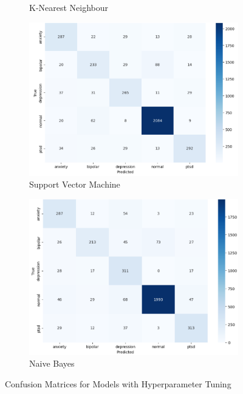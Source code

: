 \begin{figure}[H]
\begin{subfigure}[b]{0.49\textwidth}
        \caption*{K-Nearest Neighbour}
        \label{LSTMROC4}  %
    \end{subfigure}
    \hfill
    \begin{subfigure}[b]{0.49\textwidth}
        \centering
        \includegraphics[width=\textwidth]{Images/HP SVM CM.png}
        \caption*{Support Vector Machine}
        \label{LSTMROC6}  %
    \end{subfigure}
    \hfill
    \begin{subfigure}[b]{0.49\textwidth}
        \centering
        \includegraphics[width=\textwidth]{Images/HP NB CM.png}
        \caption*{Naive Bayes}
        \label{LSTMROC7}  %
        
    \end{subfigure}
    \label{fig:hp_lr_comparison}
    \caption*{Confusion Matrices for Models with Hyperparameter Tuning}
\end{figure}

